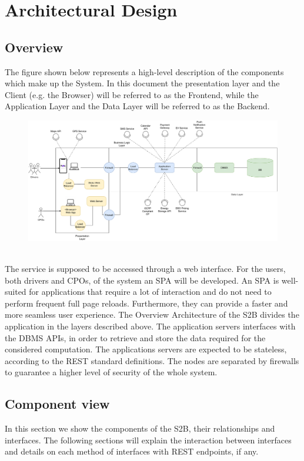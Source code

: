 \section{Architectural Design}
\subsection{Overview}
The figure shown below represents a high-level description of the components which make up the System.
In this document the presentation layer and the Client (e.g. the Browser)
will be referred to as the Frontend, while the Application Layer and the Data Layer
will be referred to as the Backend.

\begin{figure}[H]
    \centering
    \includegraphics[scale=0.42]{src/Overview/overview_diagram.pdf}
\end{figure}

\hfill \\
The service is supposed to be accessed through a web interface.
For the users, both drivers and CPOs, of the system an SPA will be developed. An SPA is well-suited for applications
that require a lot of interaction and do not need to perform frequent full page reloads.
Furthermore, they can provide a faster and more seamless user experience.
The Overview Architecture of the S2B divides the application in the layers described
above.
The application servers interfaces with the DBMS APIs, in order
to retrieve and store the data required for the considered computation.
The applications servers are expected to be stateless, according to the
REST standard definitions. The nodes are separated by firewalls to guarantee a higher level of security
of the whole system.
\pagebreak
\subsection{Component view}
In this section we show the components of the S2B, their relationships and interfaces. The following sections will explain the interaction between interfaces and details on each method of interfaces with REST endpoints, if any.

